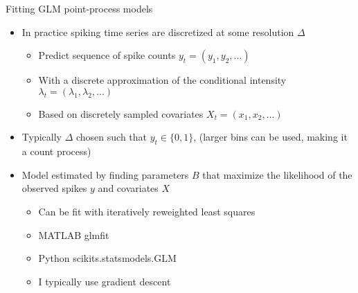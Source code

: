\documentclass[svgnames,13pt,handout]{beamer}
\begin{document}
\begin{frame}{Fitting GLM point-process models   }
\begin{itemize}
	\item <1->In practice spiking time series are discretized at some resolution $\Delta$
	\begin{itemize}
		\item <2->Predict sequence of spike counts $y_t=(y_1,y_2,...)$
		\item <3->With a discrete approximation of the conditional intensity $\lambda_t=(\lambda_1,\lambda_2,...)$
		\item <4->Based on discretely sampled covariates $X_t=(x_1,x_2,...)$
		\end{itemize}
	\item <5->Typically $\Delta$ chosen such that $y_t\in\{0,1\}$, (larger bins can be used, making it a count process)
	\item <6->Model estimated by finding parameters $B$ that maximize the likelihood of the observed spikes $y$ and covariates $X$
	\begin{itemize}
		\item <7->Can be fit with iteratively reweighted least squares 
		\item <8->MATLAB glmfit \\ \href{http://www.mathworks.com/help/stats/glmfit.html}{}
		\item <9->Python scikits.statsmodels.GLM \href{http://statsmodels.sourceforge.net/stable/glm.html}{} 
		\item <10->I typically use gradient descent
	\end{itemize}
\end{itemize}
\end{frame} 
\end{document}
